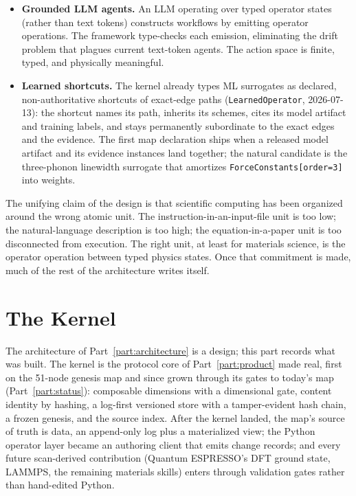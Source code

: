 \documentclass[11pt,a4paper]{article}
\begin{document}
\begin{itemize}[leftmargin=2em]
        so a measured $\kappa$ becomes another representation of the abstract $\kappa$, and
        ``does the theory match experiment'' becomes graph-alignment with one functor being
        empirical.
  \item \textbf{Grounded LLM agents.} An LLM operating over typed operator states (rather than
        text tokens) constructs workflows by emitting operator operations. The framework
        type-checks each emission, eliminating the drift problem that plagues current
        text-token agents. The action space is finite, typed, and physically meaningful.
  \item \textbf{Learned shortcuts.} The kernel already types ML surrogates as
        declared, non-authoritative shortcuts of exact-edge paths
        (\texttt{LearnedOperator}, 2026-07-13): the shortcut names its path, inherits
        its schemes, cites its model artifact and training labels, and stays
        permanently subordinate to the exact edges and the evidence. The first map
        declaration ships when a released model artifact and its evidence instances
        land together; the natural candidate is the three-phonon linewidth surrogate
        that amortizes \texttt{ForceConstants[order=3]} into weights.
\end{itemize}

The unifying claim of the design is that scientific computing has been organized around the
wrong atomic unit. The instruction-in-an-input-file unit is too low; the natural-language
description is too high; the equation-in-a-paper unit is too disconnected from execution. The
right unit, at least for materials science, is the operator operation between typed physics
states. Once that commitment is made, much of the rest of the architecture writes itself.

\part{The Kernel}
\label{part:kernel}

\noindent
The architecture of Part~\ref{part:architecture} is a design; this part records
what was built. The kernel is the protocol core of Part~\ref{part:product} made
real, first on the 51-node genesis map and since grown through its gates to
today's map (Part~\ref{part:status}): composable dimensions with a dimensional
gate, content identity by hashing, a log-first versioned store with a
tamper-evident hash chain, a frozen genesis, and the source index. After the
kernel landed, the
map's source of truth is data, an append-only log plus a materialized view; the
Python operator layer became an authoring client that emits change records; and
every future scan-derived contribution (Quantum ESPRESSO's DFT ground state,
LAMMPS, the remaining materials skills) enters through validation gates rather
than hand-edited Python.
\end{document}
